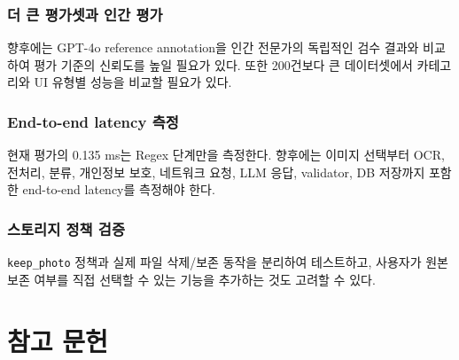 \documentclass[11pt,a4paper]{article}
\begin{document}
\subsubsection{더 큰 평가셋과 인간 평가}

향후에는 GPT-4o reference annotation을 인간 전문가의 독립적인 검수 결과와 비교하여 평가 기준의 신뢰도를 높일 필요가 있다. 또한 200건보다 큰 데이터셋에서 카테고리와 UI 유형별 성능을 비교할 필요가 있다.

\subsubsection{End-to-end latency 측정}

현재 평가의 0.135 ms는 Regex 단계만을 측정한다. 향후에는 이미지 선택부터 OCR, 전처리, 분류, 개인정보 보호, 네트워크 요청, LLM 응답, validator, DB 저장까지 포함한 end-to-end latency를 측정해야 한다.

\subsubsection{스토리지 정책 검증}

\texttt{keep\_photo} 정책과 실제 파일 삭제/보존 동작을 분리하여 테스트하고, 사용자가 원본 보존 여부를 직접 선택할 수 있는 기능을 추가하는 것도 고려할 수 있다.

\newpage

\section{참고 문헌}
\end{document}
